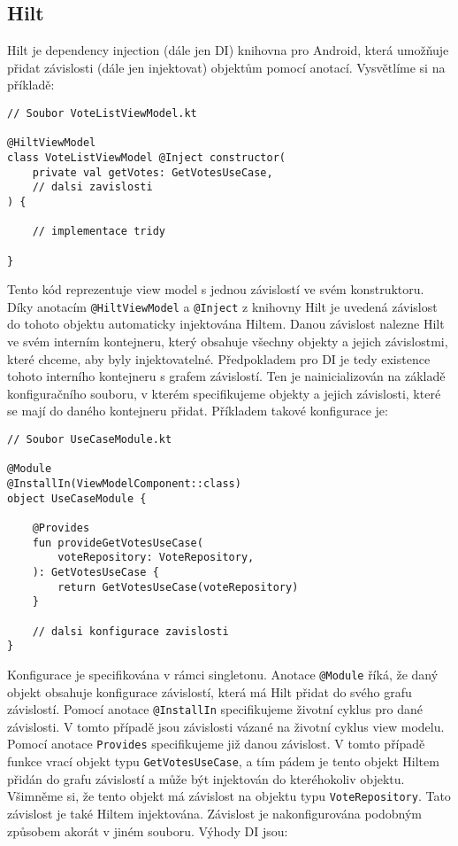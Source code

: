\subsection *{Hilt}
Hilt je dependency injection (dále jen DI) knihovna pro Android, která umožňuje přidat závislosti (dále jen injektovat) objektům pomocí anotací. Vysvětlíme si na příkladě:

\begin{lstlisting}[caption={Příklad použití DI pomocí knihovny Hilt}, label={lst:hilt-di}, tabsize=2]
// Soubor VoteListViewModel.kt

@HiltViewModel
class VoteListViewModel @Inject constructor(
	private val getVotes: GetVotesUseCase,
	// dalsi zavislosti
) {
	
	// implementace tridy
	
}
\end{lstlisting}

\noindent Tento kód reprezentuje view model s jednou závislostí ve svém konstruktoru. Díky anotacím  \lstinline|@HiltViewModel| a \lstinline|@Inject| z knihovny Hilt je uvedená závislost do tohoto objektu automaticky injektována Hiltem. Danou závislost nalezne Hilt ve svém interním kontejneru, který obsahuje všechny objekty a jejich závislostmi, které chceme, aby byly injektovatelné. Předpokladem pro DI je tedy existence tohoto interního kontejneru s grafem závislostí. Ten je nainicializován na základě konfiguračního souboru, v kterém specifikujeme objekty a jejich závislosti, které se mají do daného kontejneru přidat. Příkladem takové konfigurace je:

\begin{lstlisting}[caption={Ukázka konfigurace DI pro Hilt}, label={lst:hilt-config}, tabsize=2]
// Soubor UseCaseModule.kt

@Module
@InstallIn(ViewModelComponent::class)
object UseCaseModule {	
	
	@Provides
	fun provideGetVotesUseCase(
		voteRepository: VoteRepository,
	): GetVotesUseCase {
		return GetVotesUseCase(voteRepository)
	}

	// dalsi konfigurace zavislosti
}
\end{lstlisting}

\noindent Konfigurace je specifikována v rámci singletonu. Anotace \lstinline|@Module| říká, že daný objekt obsahuje konfigurace závislostí, která má Hilt přidat do svého grafu závislostí. Pomocí anotace \lstinline|@InstallIn| specifikujeme životní cyklus pro dané závislosti. V tomto případě jsou závislosti vázané na životní cyklus view modelu. Pomocí anotace \lstinline|Provides| specifikujeme již danou závislost. V tomto případě funkce vrací objekt typu \lstinline|GetVotesUseCase|, a tím pádem je tento objekt Hiltem přidán do grafu závislostí a může být injektován do kteréhokoliv objektu. Všimněme si, že tento objekt má závislost na objektu typu \lstinline|VoteRepository|. Tato závislost je také Hiltem injektována. Závislost je nakonfigurována podobným způsobem akorát v jiném souboru. Výhody DI jsou:

